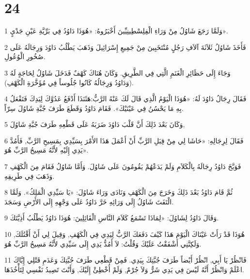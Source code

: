\chapter{24}

\par 1 وَلَمَّا رَجَعَ شَاوُلُ مِنْ وَرَاءِ الْفِلِسْطِينِيِّينَ أَخْبَرُوهُ: «هُوَذَا دَاوُدُ فِي بَرِّيَّةِ عَيْنِ جَدْيٍ».
\par 2 فَأَخَذَ شَاوُلُ ثَلاَثَةَ آلاَفِ رَجُلٍ مُنْتَخَبِينَ مِنْ جَمِيعِ إِسْرَائِيلَ وَذَهَبَ يَطْلُبُ دَاوُدَ وَرِجَالَهُ عَلَى صُخُورِ الْوُعُولِ.
\par 3 وَجَاءَ إِلَى حَظَائِرِ الْغَنَمِ الَّتِي فِي الطَّرِيقِ. وَكَانَ هُنَاكَ كَهْفٌ فَدَخَلَ شَاوُلُ لِحَاجَةٍ لَهُ (وَدَاوُدُ وَرِجَالُهُ كَانُوا جُلُوساً فِي مُؤَخَّرَةِ الْكَهْفِ).
\par 4 فَقَالَ رِجَالُ دَاوُدَ لَهُ: «هُوَذَا الْيَوْمُ الَّذِي قَالَ لَكَ عَنْهُ الرَّبُّ:هَئَنَذَا أَدْفَعُ عَدُوَّكَ لِيَدِكَ فَتَفْعَلُ بِهِ مَا يَحْسُنُ فِي عَيْنَيْكَ». فَقَامَ دَاوُدُ وَقَطَعَ طَرَفَ جُبَّةِ شَاوُلَ سِرّاً.
\par 5 وَكَانَ بَعْدَ ذَلِكَ أَنَّ قَلْبَ دَاوُدَ ضَرَبَهُ عَلَى قَطْعِهِ طَرَفَ جُبَّةِ شَاوُلَ,
\par 6 فَقَالَ لِرِجَالِهِ: «حَاشَا لِي مِنْ قِبَلِ الرَّبِّ أَنْ أَعْمَلَ هَذَا الأَمْرَ بِسَيِّدِي بِمَسِيحِ الرَّبِّ, فَأَمُدَّ يَدِي إِلَيْهِ لأَنَّهُ مَسِيحُ الرَّبِّ هُوَ».
\par 7 فَوَبَّخَ دَاوُدُ رِجَالَهُ بِالْكَلاَمِ وَلَمْ يَدَعْهُمْ يَقُومُونَ عَلَى شَاوُلَ. وَأَمَّا شَاوُلُ فَقَامَ مِنَ الْكَهْفِ وَذَهَبَ فِي طَرِيقِهِ.
\par 8 ثُمَّ قَامَ دَاوُدُ بَعْدَ ذَلِكَ وَخَرَجَ مِنَ الْكَهْفِ وَنَادَى وَرَاءَ شَاوُلَ: «يَا سَيِّدِي الْمَلِكُ». وَلَمَّا الْتَفَتَ شَاوُلُ إِلَى وَرَائِهِ خَرَّ دَاوُدُ عَلَى وَجْهِهِ إِلَى الأَرْضِ وَسَجَدَ.
\par 9 وَقَالَ دَاوُدُ لِشَاوُلَ: «لِمَاذَا تَسْمَعُ كَلاَمَ النَّاسِ الْقَائِلِينَ: هُوَذَا دَاوُدُ يَطْلُبُ أَذِيَّتَكَ.
\par 10 هُوَذَا قَدْ رَأَتْ عَيْنَاكَ الْيَوْمَ هَذَا كَيْفَ دَفَعَكَ الرَّبُّ لِيَدِي فِي الْكَهْفِ, وَقِيلَ لِي أَنْ أَقْتُلَكَ, وَلَكِنَّنِي أَشْفَقْتُ عَلَيْكَ وَقُلْتُ: لاَ أَمُدُّ يَدِي إِلَى سَيِّدِي لأَنَّهُ مَسِيحُ الرَّبِّ هُوَ.
\par 11 فَانْظُرْ يَا أَبِي, انْظُرْ أَيْضاً طَرَفَ جُبَّتِكَ بِيَدِي. فَمِنْ قَطْعِي طَرَفَ جُبَّتِكَ وَعَدَمِ قَتْلِي إِيَّاكَ اعْلَمْ وَانْظُرْ أَنَّهُ لَيْسَ فِي يَدِي شَرٌّ وَلاَ جُرْمٌ, وَلَمْ أُخْطِئْ إِلَيْكَ, وَأَنْتَ تَصِيدُ نَفْسِي لِتَأْخُذَهَا.
